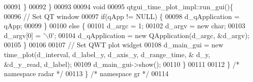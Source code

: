 \begin{DoxyCode}
00091         \}
00092     \}
00093     
00094     \textcolor{keywordtype}{void}
00095     qtgui_time_plot_impl::run_gui()\{
00096         \textcolor{comment}{// Set QT window}
00097         \textcolor{keywordflow}{if}(qApp != NULL) \{
00098             d_qApplication = qApp;
00099         \}
00100         \textcolor{keywordflow}{else} \{
00101             d_argc = 1;
00102             d_argv = \textcolor{keyword}{new} char;
00103             d_argv[0] = \textcolor{charliteral}{'\(\backslash\)0'};
00104             d_qApplication = \textcolor{keyword}{new} QApplication(d_argc, &d_argv);
00105         \}
00106         
00107         \textcolor{comment}{// Set QWT plot widget}
00108         d_main_gui = \textcolor{keyword}{new} time_plot(d_interval, d_label_y, d_axis_y, d_range_time, &
      d_y, &d_y_read, d_label);
00109         d_main_gui->show();
00110     \}
00111 
00112   \} \textcolor{comment}{/* namespace radar */}
00113 \} \textcolor{comment}{/* namespace gr */}
00114 
\end{DoxyCode}
